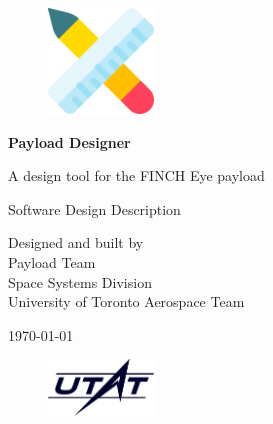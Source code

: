 \begin{titlepage}
    \begin{center}
        \vspace*{1cm}

        \begin{figure}[H]
        \centering
        \includegraphics[width=0.25\textwidth]{figures/logos/payload-designer.png}
        \end{figure}
    
        {\Huge\textbf{Payload Designer}}
            
        \bigskip
        \bigskip
        
        {\LARGE A design tool for the FINCH Eye payload}
            
        \bigskip
        \bigskip
        \bigskip
            
        {\Large Software Design Description \\}

        \vfill
        
        {\normalsize Designed and built by \\
        Payload Team \\
        Space Systems Division \\
        University of Toronto Aerospace Team \\}

        \bigskip
        \bigskip
        \bigskip
            
        {\Large \today}

        \begin{figure}[H]
            \centering
            \includegraphics[trim={0 0 0 0}, clip, width=0.25\textwidth]{figures/logos/utat.png}
            \label{fig:logo} 
        \end{figure}
        
    \end{center}
\end{titlepage}





